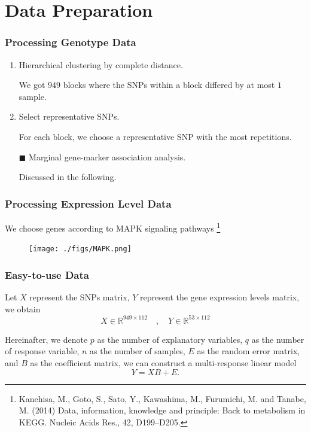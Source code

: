\section{Data Preparation}
\begin{frame}
    \sectionpage
\end{frame}

\begin{frame}
    \frametitle{Processing Genotype Data}

    \begin{enumerate}
        \item Hierarchical clustering by complete distance.

        We got $949$ blocks where the SNPs within a block differed by at most $1$ sample. 

        \item Select representative SNPs. 
        
        For each block, we choose a representative SNP with the most repetitions. 

        \item[$\blacksquare$] Marginal gene-marker association analysis. 
        
        Discussed in the following. 
    \end{enumerate}
\end{frame}

\begin{frame}
    \frametitle{Processing Expression Level Data}

    We choose genes according to MAPK signaling pathways \footnote[2]{Kanehisa, M., Goto, S., Sato, Y., Kawashima, M., Furumichi, M. and Tanabe, M. (2014) Data, information, knowledge and principle: Back to metabolism in KEGG. Nucleic Acids Res., 42, D199–D205.}

    \begin{figure}[h]
        \centering
        \texttt{[image: ./figs/MAPK.png]}
    \end{figure}
\end{frame}

\begin{frame}\frametitle{Easy-to-use Data}
    Let $X$ represent the SNPs matrix, $Y$ represent the gene expression levels matrix, we obtain
    \begin{equation*}
        X\in\mathbb{R}^{949\times112} \quad,\quad Y\in\mathbb{R}^{53\times112}
    \end{equation*}

    Hereinafter, we denote $p$ as the number of explanatory variables, $q$ as the number of response variable, $n$ as the number of samples, $E$ as the random error matrix, and $B$ as the coefficient matrix, we can construct a multi-response linear model
    \begin{equation*}
        Y = XB + E. 
    \end{equation*}
    
\end{frame}



